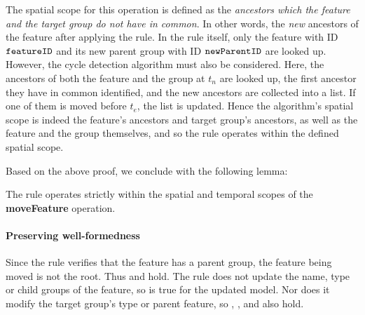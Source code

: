    The spatial scope for this operation is defined as the \emph{ancestors which the feature and the target group do not have in common}. In other words, the \emph{new} ancestors of the feature after applying the rule. In the rule itself, only the feature with ID $\texttt{featureID}$ and its new parent group with ID $\texttt{newParentID}$ are looked up. However, the cycle detection algorithm must also be considered. Here, the ancestors of both the feature and the group at $t_n$ are looked up, the first ancestor they have in common identified, and the new ancestors are collected into a list. If one of them is moved before $t_e$, the list is updated. Hence the algorithm's spatial scope is indeed the feature's ancestors and target group's ancestors, as well as the feature and the group themselves, and so the rule operates within the defined spatial scope.


Based on the above proof, we conclude with the following lemma:
\\

\begin{lemma}
   The  rule operates strictly within the spatial and temporal scopes of the \textbf{moveFeature} operation.
   \label{lemma:move-feature-scope}
\end{lemma}

\paragraph{Preserving well-formedness}
Since the rule verifies that the feature has a parent group, the feature being moved is not the root. Thus  and  hold. The rule does not update the name, type or child groups of the feature, so  is true for the updated model. Nor does it modify the target group's type or parent feature, so , , and  also hold.

